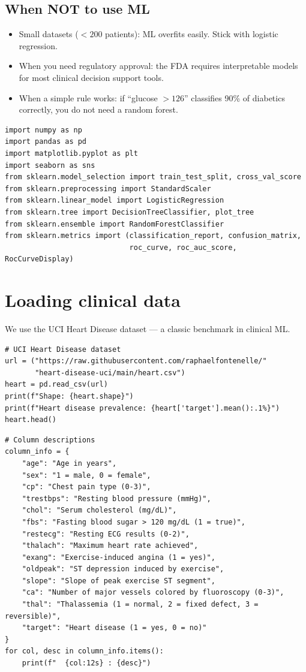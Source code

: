 \subsection{When NOT to use ML}

\begin{itemize}
  \item Small datasets ($< 200$ patients): ML overfits easily. Stick with logistic regression.
  \item When you need regulatory approval: the FDA requires interpretable models for most clinical decision support tools.
  \item When a simple rule works: if ``glucose $> 126$'' classifies 90\% of diabetics correctly, you do not need a random forest.
\end{itemize}

\begin{verbatim}
import numpy as np
import pandas as pd
import matplotlib.pyplot as plt
import seaborn as sns
from sklearn.model_selection import train_test_split, cross_val_score
from sklearn.preprocessing import StandardScaler
from sklearn.linear_model import LogisticRegression
from sklearn.tree import DecisionTreeClassifier, plot_tree
from sklearn.ensemble import RandomForestClassifier
from sklearn.metrics import (classification_report, confusion_matrix,
                             roc_curve, roc_auc_score, RocCurveDisplay)
\end{verbatim}

\section{Loading clinical data}

We use the UCI Heart Disease dataset --- a classic benchmark in clinical ML.

\begin{verbatim}
# UCI Heart Disease dataset
url = ("https://raw.githubusercontent.com/raphaelfontenelle/"
       "heart-disease-uci/main/heart.csv")
heart = pd.read_csv(url)
print(f"Shape: {heart.shape}")
print(f"Heart disease prevalence: {heart['target'].mean():.1%}")
heart.head()
\end{verbatim}

\begin{verbatim}
# Column descriptions
column_info = {
    "age": "Age in years",
    "sex": "1 = male, 0 = female",
    "cp": "Chest pain type (0-3)",
    "trestbps": "Resting blood pressure (mmHg)",
    "chol": "Serum cholesterol (mg/dL)",
    "fbs": "Fasting blood sugar > 120 mg/dL (1 = true)",
    "restecg": "Resting ECG results (0-2)",
    "thalach": "Maximum heart rate achieved",
    "exang": "Exercise-induced angina (1 = yes)",
    "oldpeak": "ST depression induced by exercise",
    "slope": "Slope of peak exercise ST segment",
    "ca": "Number of major vessels colored by fluoroscopy (0-3)",
    "thal": "Thalassemia (1 = normal, 2 = fixed defect, 3 = reversible)",
    "target": "Heart disease (1 = yes, 0 = no)"
}
for col, desc in column_info.items():
    print(f"  {col:12s} : {desc}")
\end{verbatim}

